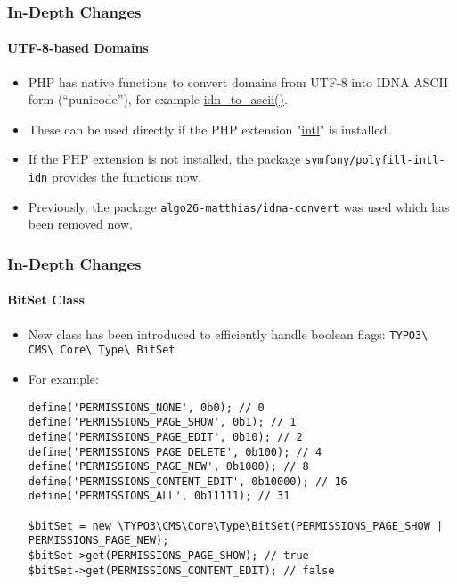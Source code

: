 \begin{frame}[fragile]
	\frametitle{In-Depth Changes}
	\framesubtitle{UTF-8-based Domains}

	\begin{itemize}
		\item PHP has native functions to convert domains from UTF-8 into IDNA ASCII form (“punicode”),
			for example \href{https://www.php.net/manual/en/function.idn-to-ascii.php}{idn\_to\_ascii()}.

		\item These can be used directly if the PHP extension
			"\href{https://www.php.net/manual/en/book.intl.php}{intl}" is installed.

		\item If the PHP extension is not installed, the package \texttt{symfony/polyfill-intl-idn}
			provides the functions now.

		\item Previously, the package \texttt{algo26-matthias/idna-convert} was used which has been removed now.

	\end{itemize}

\end{frame}


\begin{frame}[fragile]
	\frametitle{In-Depth Changes}
	\framesubtitle{BitSet Class}

	\lstset{basicstyle=\tiny\ttfamily}

	\begin{itemize}
		\item New class has been introduced to efficiently handle boolean flags:\newline
			\texttt{TYPO3\textbackslash
				CMS\textbackslash
				Core\textbackslash
				Type\textbackslash
				BitSet}

		\item For example:
\begin{lstlisting}
define('PERMISSIONS_NONE', 0b0); // 0
define('PERMISSIONS_PAGE_SHOW', 0b1); // 1
define('PERMISSIONS_PAGE_EDIT', 0b10); // 2
define('PERMISSIONS_PAGE_DELETE', 0b100); // 4
define('PERMISSIONS_PAGE_NEW', 0b1000); // 8
define('PERMISSIONS_CONTENT_EDIT', 0b10000); // 16
define('PERMISSIONS_ALL', 0b11111); // 31

$bitSet = new \TYPO3\CMS\Core\Type\BitSet(PERMISSIONS_PAGE_SHOW | PERMISSIONS_PAGE_NEW);
$bitSet->get(PERMISSIONS_PAGE_SHOW); // true
$bitSet->get(PERMISSIONS_CONTENT_EDIT); // false
\end{lstlisting}

	\end{itemize}

\end{frame}


